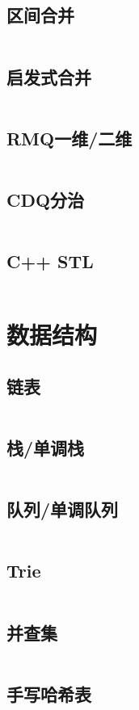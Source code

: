 \documentclass[a4paper,12pt]{article}
\begin{document}
\subsection{区间合并}
\inputminted[breaklines, linenos]{c++}{basic/interval_union.cc}
\subsection{启发式合并}
\inputminted[breaklines, linenos]{c++}{basic/heuristic_merge.cc}
\subsection{RMQ一维/二维}
\inputminted[breaklines, linenos]{c++}{basic/rmq.cc}
\subsection{CDQ分治}
\inputminted[breaklines, linenos]{c++}{basic/cdq.cc}
\subsection{C++ STL}
\inputminted[breaklines, linenos]{md}{basic/stl.cc}

\newpage
\section{数据结构}
\subsection{链表}
\inputminted[breaklines, linenos]{c++}{ds/list.cc}
\subsection{栈/单调栈}
\inputminted[breaklines, linenos]{c++}{ds/stack.cc}
\subsection{队列/单调队列}
\inputminted[breaklines, linenos]{c++}{ds/queue.cc}
\subsection{Trie}
\inputminted[breaklines, linenos]{c++}{ds/trie.cc}
\subsection{并查集}
\inputminted[breaklines, linenos]{c++}{ds/dsu.cc}
\subsection{手写哈希表}
\inputminted[breaklines, linenos]{c++}{ds/hash.cc}
\end{document}
